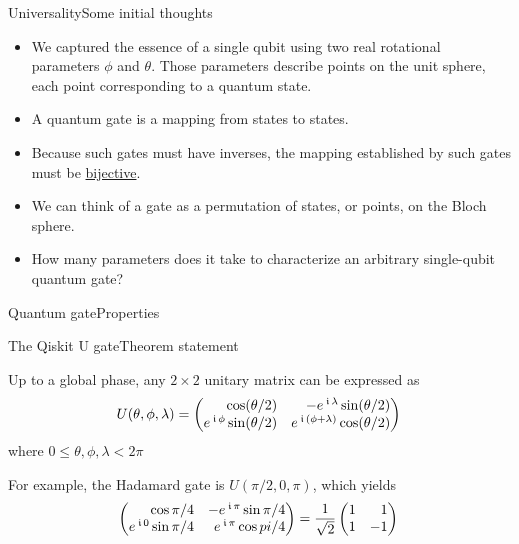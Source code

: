 
\begin{frame}{Universality}{Some initial thoughts}

\begin{itemize}[<+->]
    \item We captured the essence of a single qubit using two real rotational parameters $\phi$ and $\theta$.  Those parameters describe points on the unit sphere, each point corresponding to a quantum state.
    \item A quantum gate is a mapping from states to states.
    \item Because such gates must have inverses, the mapping established by such gates must be \href{https://en.wikipedia.org/wiki/Bijection}{bijective}.
    \item We can think of a gate as a permutation of states, or points, on the Bloch sphere.
    \item How many parameters does it take to characterize an arbitrary single-qubit quantum gate?
\end{itemize}

    
\end{frame}

\begin{frame}{Quantum gate}{Properties}

\BigSkip{}
    
\end{frame}

\begin{frame}{The Qiskit U gate}{Theorem statement}
\begin{theorem}
   Up to a global phase, any $2\times 2$ unitary matrix can be expressed as
    \[
    U(\theta, \phi, \lambda) = 
    \UGate{}
    \] where
    $0 \leq \theta,\phi,\lambda < 2\pi$
    \end{theorem}
    For example, the Hadamard gate \HMatrix{} is $U(\pi/2, 0, \pi)$, which yields
    \[
    \SQBG{\relax}{\cos \pi/4}{-\ExpPhase{\pi}\sin \pi/4}{\ExpPhase{0}\sin \pi/4}{\ExpPhase{\pi}\cos pi/4} = \HMatrix{}
    \]

\end{frame}

